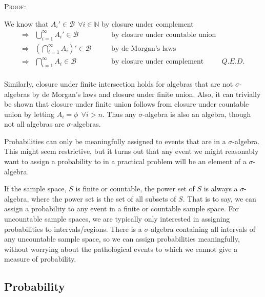 \documentclass[12pt,a4paper]{article}
\begin{document}
\noindent \textsc{Proof:}\par
\vspace{12pt}
\indent We know that $A_i'\in\mathcal{B}\:\:\forall i\in\mathbb{N}$ by closure under complement
$$\begin{array}{cllr}
\Rightarrow& \bigcup\limits_{i=1}^{\infty}A_i'\in\mathcal{B}\qquad &\text{by closure under countable union}&\\
\Rightarrow& \left(\bigcap\limits_{i=1}^{\infty}A_i\right)'\in\mathcal{B}\qquad &\text{by de Morgan's laws}&\\
\Rightarrow& \bigcap\limits_{i=1}^{\infty}A_i\in\mathcal{B}\qquad &\text{by closure under complement}&Q.E.D.\\
\end{array}$$

Similarly, closure under finite intersection holds for algebras that are not $\sigma$-algebras by de Morgan's laws and closure under finite union. Also, it can trivially be shown that closure under finite union follows from closure under countable union by letting $A_i=\phi\:\:\forall i>n$. Thus any $\sigma$-algebra is also an algebra, though not all algebras are $\sigma$-algebras.

Probabilities can only be meaningfully assigned to events that are in a $\sigma$-algebra. This might seem restrictive, but it turns out that any event we might reasonably want to assign a probability to in a practical problem will be an element of a $\sigma$-algebra.

If the sample space, $S$ is finite or countable, the power set of $S$ is always a $\sigma$-algebra, where the power set is the set of all subsets of $S$. That is to say, we can assign a probability to any event in a finite or countable sample space. For uncountable sample spaces, we are typically only interested in assigning probabilities to intervals/regions. There is a $\sigma$-algebra containing all intervals of any uncountable sample space, so we can assign probabilities meaningfully, without worrying about the pathological events to which we cannot give a measure of probability.\par
\vspace{12pt}


\subsection{Probability}$\;$
\end{document}
